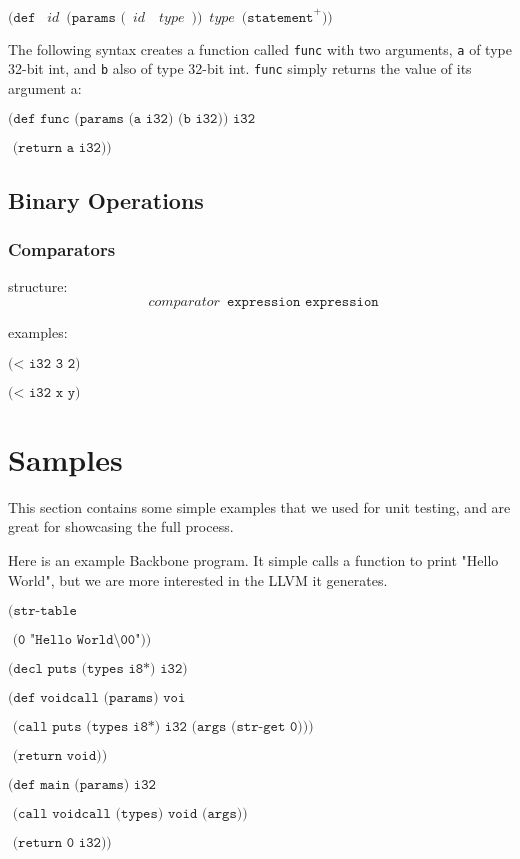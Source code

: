 \documentclass[journal=jacsat, manuscript=article]{achemso}
\begin{document}
$\texttt{(def }\,\,\,id\,\,\,\texttt{(params (}\,\,\,id\,\,\,\,\,\,type\,\,\,\texttt{))}\,\,\,type\,\,\,\texttt{(statement}^+\texttt{))}$


The following syntax creates a function called \texttt{func} with two arguments, \texttt{a} of type 32-bit int, and \texttt{b} also of type 32-bit int. \texttt{func} simply returns the value of its argument a:

$\texttt{(def func (params (a i32) (b i32)) i32}$

$\texttt{  (return a i32))}$

\subsection{Binary Operations} 
\subsubsection{Comparators}
structure:
$$\,\,\,comparator\,\,\, \texttt{expression } \texttt{expression}$$

examples: 

$\texttt{(< i32 3 2)}$

$\texttt{(< i32 x y)}$

\section{Samples} 

This section contains some simple examples that we used for unit testing, and are great for showcasing the full process.

Here is an example Backbone program. It simple calls a function to print "Hello World", but we are more interested in the LLVM it generates.

$\texttt{(str-table}$

$\texttt{  (0 "Hello World\textbackslash00"))}$


$\texttt{(decl puts (types i8*) i32)}$


$\texttt{(def voidcall (params) voi}$

$\texttt{  (call puts (types i8*) i32 (args (str-get 0)))}$

$\texttt{  (return void))}$


$\texttt{(def main (params) i32}$

$\texttt{  (call voidcall (types) void (args))}$

$\texttt{  (return 0 i32))}$

$\texttt{}$
\end{document}
